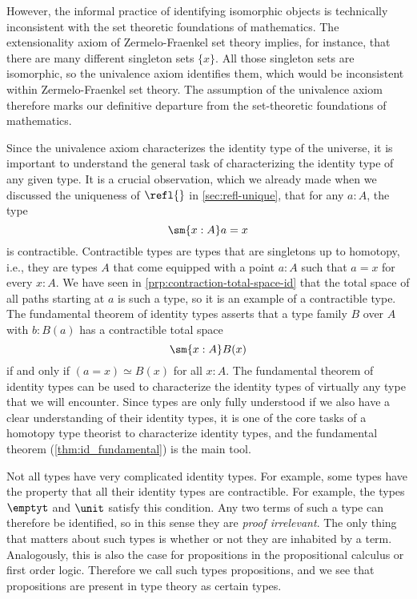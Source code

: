 However, the informal practice of identifying isomorphic objects is technically inconsistent with the set theoretic foundations of mathematics. The extensionality axiom of Zermelo-Fraenkel set theory implies, for instance, that there are many different singleton sets $\{x\}$. All those singleton sets are isomorphic, so the univalence axiom identifies them, which would be inconsistent within Zermelo-Fraenkel set theory. The assumption of the univalence axiom therefore marks our definitive departure from the set-theoretic foundations of mathematics.

Since the univalence axiom characterizes the identity type of the universe, it is important to understand the general task of characterizing the identity type of any given type. It is a crucial observation, which we already made when we discussed the uniqueness of $\refl{}$ in \cref{sec:refl-unique}, that for any $a:A$, the type
\begin{equation*}
  \sm{x:A}a=x  
\end{equation*}
is contractible. Contractible types are types that are singletons up to homotopy, i.e., they are types $A$ that come equipped with a point $a:A$ such that $a=x$ for every $x:A$. We have seen in \cref{prp:contraction-total-space-id} that the total space of all paths starting at $a$ is such a type, so it is an example of a contractible type. The fundamental theorem of identity types asserts that a type family $B$ over $A$ with $b:B(a)$ has a contractible total space
\begin{equation*}
  \sm{x:A}B(x)
\end{equation*}
if and only if $(a=x)\simeq B(x)$ for all $x:A$. The fundamental theorem of identity types can be used to characterize the identity types of virtually any type that we will encounter. Since types are only fully understood if we also have a clear understanding of their identity types, it is one of the core tasks of a homotopy type theorist to characterize identity types, and the fundamental theorem (\cref{thm:id_fundamental}) is the main tool.

Not all types have very complicated identity types. For example, some types have the property that all their identity types are contractible. For example, the types $\emptyt$ and $\unit$ satisfy this condition. Any two terms of such a type can therefore be identified, so in this sense they are \emph{proof irrelevant}. The only thing that matters about such types is whether or not they are inhabited by a term. Analogously, this is also the case for propositions in the propositional calculus or first order logic. Therefore we call such types propositions, and we see that propositions are present in type theory as certain types.

